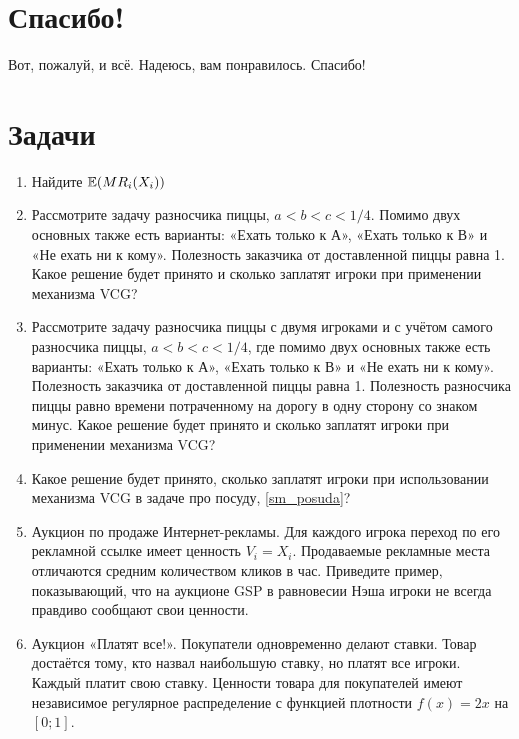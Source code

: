 \section{Спасибо!}

Вот, пожалуй, и всё. Надеюсь, вам понравилось. Спасибо!



\section{Задачи}

\begin{enumerate}
\item Найдите $ \operatorname{\mathbb{E}}(MR_{i}(X_{i})) $

\item Рассмотрите задачу разносчика пиццы, $ a<b<c<1/4 $. Помимо двух основных также есть варианты: «Ехать только к А», «Ехать только к В» и «Не ехать ни к кому». Полезность заказчика от доставленной пиццы равна 1. Какое решение будет принято и сколько заплатят игроки при применении механизма VCG?

\item Рассмотрите задачу разносчика пиццы с двумя игроками и с учётом самого разносчика пиццы, $ a<b<c<1/4 $, где помимо двух основных также есть варианты: «Ехать только к А», «Ехать только к В» и «Не ехать ни к кому». Полезность заказчика от доставленной пиццы равна 1. Полезность разносчика пиццы равно времени потраченному на дорогу в одну сторону со знаком минус. Какое решение будет принято и сколько заплатят игроки при применении механизма VCG?

\item Какое решение будет принято, сколько заплатят игроки при использовании механизма VCG в задаче про посуду, \ref{sm_posuda}?

\item Аукцион по продаже Интернет-рекламы. Для каждого игрока переход по его рекламной ссылке имеет ценность $ V_{i}=X_{i} $. Продаваемые рекламные места отличаются средним количеством кликов в час. Приведите пример, показывающий, что на аукционе GSP в равновесии Нэша игроки не всегда правдиво сообщают свои ценности.

\item Аукцион «Платят все!». Покупатели одновременно делают ставки. Товар достаётся
тому, кто назвал наибольшую ставку, но платят все игроки. Каждый платит свою
ставку. Ценности товара для покупателей имеют независимое регулярное распределение с функцией плотности $ f(x)=2x $ на $ [0;1] $.


\end{enumerate}
